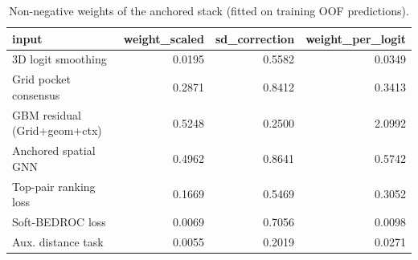 \begin{table}[t]
\centering
\small
\caption{Non-negative weights of the anchored stack (fitted on training OOF predictions).}
\label{tab:table6_stack_weights}
\begin{tabular}{lrrr}
\toprule
input & weight\_scaled & sd\_correction & weight\_per\_logit \\
\midrule
3D logit smoothing & 0.0195 & 0.5582 & 0.0349 \\
Grid pocket consensus & 0.2871 & 0.8412 & 0.3413 \\
GBM residual (Grid+geom+ctx) & 0.5248 & 0.2500 & 2.0992 \\
Anchored spatial GNN & 0.4962 & 0.8641 & 0.5742 \\
Top-pair ranking loss & 0.1669 & 0.5469 & 0.3052 \\
Soft-BEDROC loss & 0.0069 & 0.7056 & 0.0098 \\
Aux. distance task & 0.0055 & 0.2019 & 0.0271 \\
\bottomrule
\end{tabular}
\end{table}
